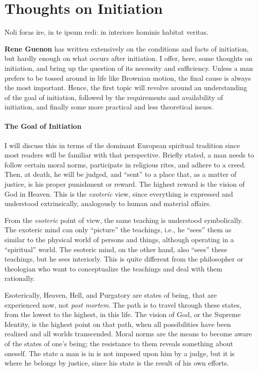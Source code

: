 \section{Thoughts on Initiation}

\begin{quotex}
Noli foras ire, in te ipsum redi: in interiore hominis habitat veritas. 
\end{quotex}

\textbf{Rene Guenon} has written extensively on the conditions and facts of initiation, but hardly enough on what occurs after initiation. I offer, here, some thoughts on initiation, and bring up the question of its necessity and sufficiency. Unless a man prefers to be tossed around in life like Brownian motion, the final cause is always the most important. Hence, the first topic will revolve around an understanding of the goal of initiation, followed by the requirements and availability of initiation, and finally some more practical and less theoretical issues.

\paragraph{The Goal of Initiation}


I will discuss this in terms of the dominant European spiritual tradition since most readers will be familiar with that perspective. Briefly stated, a man needs to follow certain moral norms, participate in religious rites, and adhere to a creed. Then, at death, he will be judged, and ``sent'' to a place that, as a matter of justice, is his proper punishment or reward. The highest reward is the vision of God in Heaven. This is the \emph{exoteric} view, since everything is expressed and understood extrinsically, analogously to human and material affairs.

From the \emph{esoteric} point of view, the same teaching is understood symbolically. The exoteric mind can only ``picture'' the teachings, i.e., he ``sees'' them as similar to the physical world of persons and things, although operating in a ``spiritual'' world. The esoteric mind, on the other hand, also ``sees'' these teachings, but he sees interiorly. This is quite different from the philosopher or theologian who want to conceptualize the teachings and deal with them rationally.

Esoterically, Heaven, Hell, and Purgatory are states of being, that are experienced now, not \emph{post mortem}. The path is to travel through these states, from the lowest to the highest, in this life. The vision of God, or the Supreme Identity, is the highest point on that path, when all possibilities have been realized and all worlds transcended. Moral norms are the means to become aware of the states of one's being; the resistance to them reveals something about oneself. The state a man is in is not imposed upon him by a judge, but it is where he belongs by justice, since his state is the result of his own efforts.

